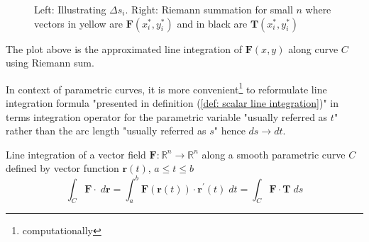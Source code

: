 \documentclass[../../main.tex]{subfiles}
\begin{document}
\begin{solution}
\begin{figure*}[h]
\begin{subfigure}[c]{0.45\textwidth}
			\end{subfigure}
			\caption{Left: Illustrating $\Delta s_i$. Right: Riemann summation for small $n$ where vectors in yellow are $\mathbf{F}(x_i^*, y_i^*)$ and in black are $\mathbf{T}(x_i^*, y_i^*)$}
		\end{figure*}
	
		The plot above is the approximated line integration of $\mathbf{F}(x,y)$ along curve $C$ using Riemann sum.
	\end{solution}
	
	\par In context of parametric curves, it is more convenient\footnote{computationally} to reformulate line integration formula  "presented in definition (\ref{def: scalar line integration})" in terms integration operator for the parametric variable "usually referred as $t$" rather than the arc length "usually referred as $s$" hence $ds \rightarrow dt$.
	
	\begin{definition}
		Line integration of a vector field $\mathbf{F}: \mathbb{R}^n \rightarrow \mathbb{R}^n$ along a smooth parametric curve $C$ defined by vector function $\mathbf{r}(t)$, $a \leq t \leq b$ 
		\begin{equation*}
			\int_C \mathbf{F} \cdot \; d\mathbf{r} = \int_a^b \mathbf{F}(\mathbf{r}(t)) \cdot \mathbf{r}^\prime(t) \; dt = \int_C \mathbf{F} \cdot \mathbf{T} \; ds
		\end{equation*}
	\end{definition}
\end{document}
